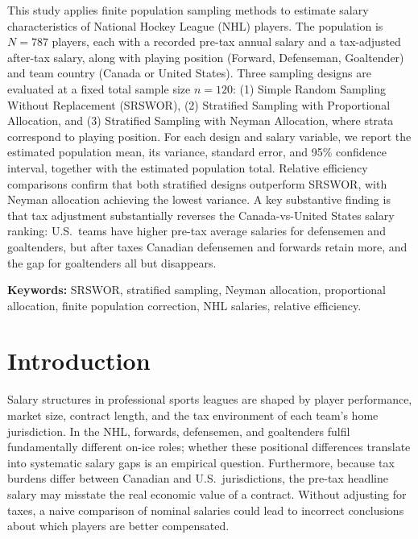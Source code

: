 \documentclass[12pt]{article}
\begin{document}
This study applies finite population sampling methods to estimate salary
characteristics of National Hockey League (NHL) players.
The population is $N = 787$ players, each with a recorded pre-tax annual salary and a
tax-adjusted after-tax salary, along with playing position (Forward, Defenseman,
Goaltender) and team country (Canada or United States).
Three sampling designs are evaluated at a fixed total sample size $n = 120$:
(1) Simple Random Sampling Without Replacement (SRSWOR),
(2) Stratified Sampling with Proportional Allocation, and
(3) Stratified Sampling with Neyman Allocation, where strata correspond to playing
position.
For each design and salary variable, we report the estimated population mean, its
variance, standard error, and 95\% confidence interval, together with the estimated
population total.
Relative efficiency comparisons confirm that both stratified designs outperform SRSWOR,
with Neyman allocation achieving the lowest variance.
A key substantive finding is that tax adjustment substantially reverses the
Canada-vs-United States salary ranking: U.S.\ teams have higher pre-tax average
salaries for defensemen and goaltenders, but after taxes Canadian defensemen and
forwards retain more, and the gap for goaltenders all but disappears.

\noindent\textbf{Keywords:} SRSWOR, stratified sampling, Neyman allocation,
proportional allocation, finite population correction, NHL salaries, relative efficiency.

\newpage

\section{Introduction}
\label{sec:intro}

Salary structures in professional sports leagues are shaped by player performance,
market size, contract length, and the tax environment of each team's home jurisdiction.
In the NHL, forwards, defensemen, and goaltenders fulfil fundamentally different
on-ice roles; whether these positional differences translate into systematic salary gaps
is an empirical question.
Furthermore, because tax burdens differ between Canadian and U.S.\ jurisdictions, the
pre-tax headline salary may misstate the real economic value of a contract.
Without adjusting for taxes, a naive comparison of nominal salaries could lead to
incorrect conclusions about which players are better compensated.
\end{document}
